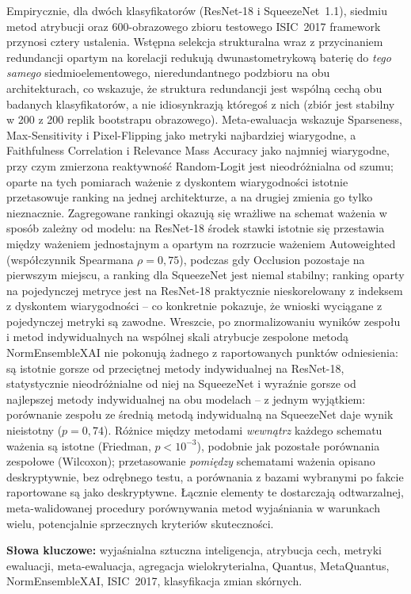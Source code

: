 \documentclass[en,11pt]{aghdpl}  %
\begin{document}
\begin{otherlanguage}{polish}
Empirycznie, dla dwóch klasyfikatorów (ResNet-18 i SqueezeNet~1.1), siedmiu
metod atrybucji oraz 600-obrazowego zbioru testowego ISIC~2017 framework
przynosi cztery ustalenia. Wstępna selekcja strukturalna wraz z przycinaniem
redundancji opartym na korelacji redukują dwunastometrykową baterię
do \emph{tego samego} siedmioelementowego, nieredundantnego
podzbioru na obu architekturach, co wskazuje, że struktura redundancji jest
wspólną cechą obu badanych klasyfikatorów, a nie idiosynkrazją któregoś z
nich (zbiór jest stabilny w 200 z 200 replik bootstrapu obrazowego).
Meta-ewaluacja wskazuje
Sparseness, Max-Sensitivity i Pixel-Flipping jako metryki najbardziej
wiarygodne, a Faithfulness Correlation i Relevance Mass
Accuracy jako najmniej wiarygodne, przy czym zmierzona reaktywność
Random-Logit jest nieodróżnialna od szumu; oparte na tych pomiarach ważenie
z dyskontem
wiarygodności istotnie przetasowuje ranking na jednej architekturze, a na
drugiej zmienia go tylko nieznacznie. Zagregowane rankingi okazują się
wrażliwe na schemat
ważenia w sposób zależny od modelu: na ResNet-18 środek stawki istotnie się
przestawia między ważeniem jednostajnym a opartym na rozrzucie ważeniem
Autoweighted (współczynnik Spearmana $\rho = 0{,}75$), podczas gdy Occlusion
pozostaje na pierwszym miejscu, a ranking dla SqueezeNet jest niemal
stabilny; ranking oparty na pojedynczej metryce jest na ResNet-18
praktycznie nieskorelowany z indeksem z dyskontem wiarygodności -- co
konkretnie pokazuje, że wnioski
wyciągane z pojedynczej metryki są zawodne. Wreszcie, po znormalizowaniu
wyników zespołu i metod indywidualnych na wspólnej skali atrybucje zespolone
metodą NormEnsembleXAI nie pokonują żadnego z raportowanych punktów
odniesienia: są istotnie gorsze od przeciętnej metody indywidualnej na
ResNet-18, statystycznie nieodróżnialne od niej na SqueezeNet i wyraźnie
gorsze od najlepszej metody indywidualnej na obu modelach -- z jednym
wyjątkiem: porównanie zespołu ze średnią metodą indywidualną na SqueezeNet
daje wynik nieistotny ($p = 0{,}74$). Różnice między metodami
\emph{wewnątrz} każdego schematu ważenia są istotne (Friedman,
$p < 10^{-3}$), podobnie jak pozostałe porównania zespołowe (Wilcoxon);
przetasowanie \emph{pomiędzy} schematami ważenia opisano deskryptywnie, bez
odrębnego testu, a porównania z bazami wybranymi po fakcie raportowane są
jako deskryptywne. Łącznie elementy te dostarczają odtwarzalnej,
meta-walidowanej procedury porównywania metod wyjaśniania w warunkach wielu,
potencjalnie sprzecznych kryteriów skuteczności.

\vspace{1em}
\noindent\textbf{Słowa kluczowe:} wyjaśnialna sztuczna inteligencja,
atrybucja cech, metryki ewaluacji, meta-ewaluacja, agregacja
wielokryterialna, Quantus, MetaQuantus, NormEnsembleXAI, ISIC~2017,
klasyfikacja zmian skórnych.
\end{otherlanguage}
\newpage
\end{document}
